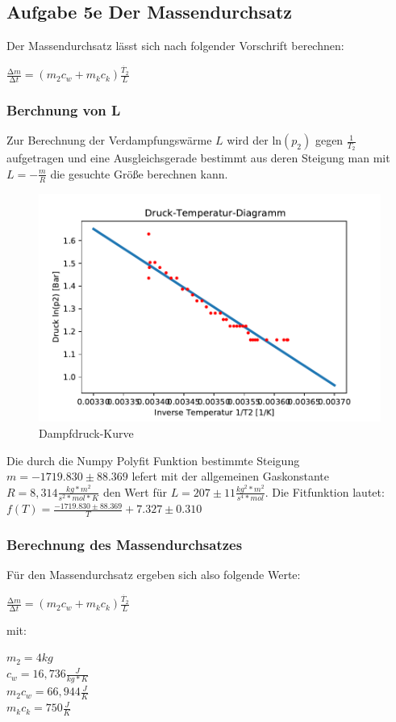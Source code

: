 \subsection{Aufgabe 5e Der Massendurchsatz}
Der Massendurchsatz lässt sich nach folgender Vorschrift berechnen:

\begin{center}
  $\frac{\increment m}{\increment t}=(m_2 c_w + m_k c_k)\frac{\dot{T_2}}{L}$
\end{center}
\subsubsection{Berchnung von L}
Zur Berechnung der Verdampfungswärme $L$ wird der ln$(p_2)$ gegen $\frac{1}{T_2}$ aufgetragen und eine 
Ausgleichsgerade bestimmt aus deren Steigung man mit $L=-\frac{m}{R}$ die gesuchte Größe berechnen kann.

\begin{figure}
  \centering
  \includegraphics{Drucktemperaturdiagram.pdf}
  \caption{Dampfdruck-Kurve}
  \label{fig:DampfdruckKurve}
\end{figure}

\noindent Die durch die Numpy Polyfit Funktion bestimmte Steigung $m=-1719.830\pm88.369$ lefert mit der allgemeinen Gaskonstante
$R=8,314\frac{kg*m^2}{s^2*mol*K}$ den Wert für $L=207\pm11\frac{kg^2*m^2}{s^4*mol}$.
Die Fitfunktion lautet:$f(T)=\frac{-1719.830\pm88.369}{T}+7.327\pm0.310$

\subsubsection{Berechnung des Massendurchsatzes}
Für den Massendurchsatz ergeben sich also folgende Werte:
\begin{center}
  $\frac{\increment m}{\increment t}=(m_2 c_w + m_k c_k)\frac{\dot{T_2}}{L}$
\end{center}
mit:
\begin{center}
  $m_2=4kg$\\
  $c_w=16,736\frac{J}{kg*K}$\\
  $m_2 c_w=66,944\frac{J}{K}$\\
  $m_k c_k=750\frac{J}{K}$
\end{center}

